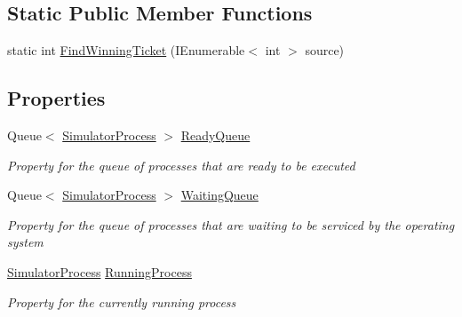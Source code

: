 \subsection*{Static Public Member Functions}
\begin{DoxyCompactItemize}
\item 
static int \hyperlink{class_c_p_u___o_s___simulator_1_1_operating___system_1_1_scheduler_a652b744d35a335b5e834ea25c1df00e5}{Find\+Winning\+Ticket} (I\+Enumerable$<$ int $>$ source)
\end{DoxyCompactItemize}
\subsection*{Properties}
\begin{DoxyCompactItemize}
\item 
Queue$<$ \hyperlink{class_c_p_u___o_s___simulator_1_1_operating___system_1_1_simulator_process}{Simulator\+Process} $>$ \hyperlink{class_c_p_u___o_s___simulator_1_1_operating___system_1_1_scheduler_a7f0cc5668527496de0028013dae3be0c}{Ready\+Queue}
\begin{DoxyCompactList}\small\item\em Property for the queue of processes that are ready to be executed \end{DoxyCompactList}\item 
Queue$<$ \hyperlink{class_c_p_u___o_s___simulator_1_1_operating___system_1_1_simulator_process}{Simulator\+Process} $>$ \hyperlink{class_c_p_u___o_s___simulator_1_1_operating___system_1_1_scheduler_aac41827d1eff5710d0a9b5ea664dd99f}{Waiting\+Queue}
\begin{DoxyCompactList}\small\item\em Property for the queue of processes that are waiting to be serviced by the operating system \end{DoxyCompactList}\item 
\hyperlink{class_c_p_u___o_s___simulator_1_1_operating___system_1_1_simulator_process}{Simulator\+Process} \hyperlink{class_c_p_u___o_s___simulator_1_1_operating___system_1_1_scheduler_a6de759cc7e75011ef51456dd95104a95}{Running\+Process}
\begin{DoxyCompactList}\small\item\em Property for the currently running process \end{DoxyCompactList}\item 

\end{DoxyCompactItemize}
